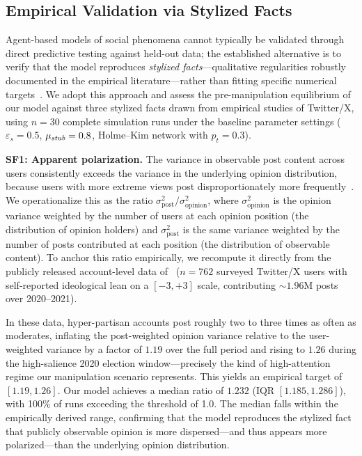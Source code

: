 \documentclass[pdflatex,sn-mathphys-num]{sn-jnl}%
\theoremstyle{thmstyleone}%
\theoremstyle{thmstyletwo}%
\theoremstyle{thmstylethree}%
\def\Stubbornness{\mu_{\it stub}}
\def\ThofOpPreval{\varepsilon_s}
\begin{document}
\subsection{Empirical Validation via Stylized Facts}\label{sf_validation}

Agent-based models of social phenomena cannot typically be validated through 
direct predictive testing against held-out data; 
the established alternative is to verify that the model 
reproduces \emph{stylized facts}---qualitative regularities robustly 
documented in the empirical literature---rather than fitting specific 
numerical targets~\cite{Fagiolo2007}. 
We adopt this approach and assess the pre-manipulation equilibrium of 
our model against three stylized facts drawn from empirical studies 
of Twitter/X, using $n = 30$ complete simulation runs under the baseline
parameter settings ($\ThofOpPreval = 0.5$, $\Stubbornness = 0.8$, Holme--Kim network with $p_t = 0.3$).

\noindent\textbf{SF1: Apparent polarization.}
The variance in observable post content across users consistently
exceeds the variance in the underlying opinion distribution,
because users with more extreme views post disproportionately
more frequently~\cite{Buntain2025}.
We operationalize this as the ratio $\sigma_{\mathrm{post}}^{2} / \sigma_{\mathrm{opinion}}^{2}$,
where $\sigma_{\mathrm{opinion}}^{2}$ is the opinion variance weighted by the
number of users at each opinion position (the distribution of opinion holders)
and $\sigma_{\mathrm{post}}^{2}$ is the same variance weighted by the number of
posts contributed at each position (the distribution of observable content).
To anchor this ratio empirically, we recompute it directly from the
publicly released account-level data of~\cite{Buntain2025}
($n = 762$ surveyed Twitter/X users with self-reported ideological lean on a
$[-3, +3]$ scale, contributing $\sim\!1.96$M posts over 2020--2021).


In these data, hyper-partisan accounts post roughly two to three times as
often as moderates, inflating the post-weighted opinion variance relative to
the user-weighted variance by a factor of $1.19$ over the full period and
rising to $1.26$ during the high-salience 2020 election window---precisely the
kind of high-attention regime our manipulation scenario represents.
This yields an empirical target of $[1.19, 1.26]$.
Our model achieves a median ratio of $1.232$ (IQR $[1.185, 1.286]$),
with 100\% of runs exceeding the threshold of 1.0.
The median falls within the empirically derived range, confirming that
the model reproduces the stylized fact that publicly observable
opinion is more dispersed---and thus appears more polarized---than
the underlying opinion distribution.
\end{document}
